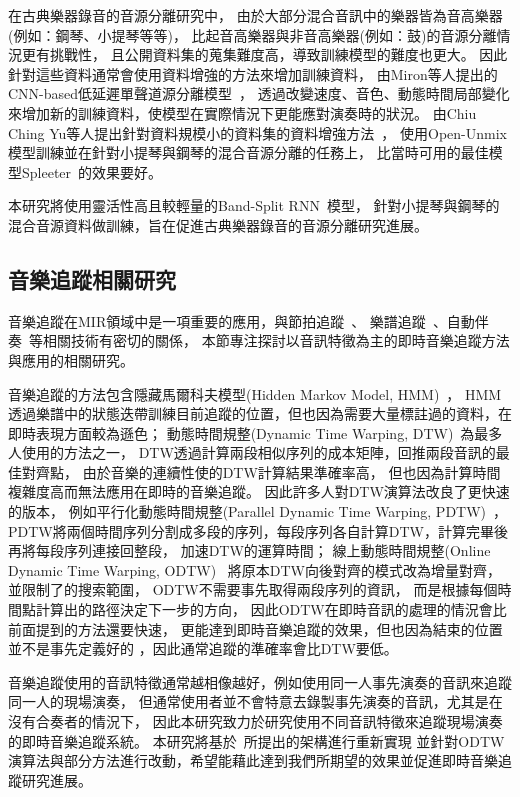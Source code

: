 \documentclass[class=NCU_thesis, crop=false]{standalone}
\begin{document}
在古典樂器錄音的音源分離研究中，
由於大部分混合音訊中的樂器皆為音高樂器(例如：鋼琴、小提琴等等)，
比起音高樂器與非音高樂器(例如：鼓)的音源分離情況更有挑戰性，
且公開資料集的蒐集難度高，導致訓練模型的難度也更大。
因此針對這些資料通常會使用資料增強的方法來增加訓練資料，
由Miron等人提出的CNN-based低延遲單聲道源分離模型~\cite{miron2017generating}，
透過改變速度、音色、動態時間局部變化來增加新的訓練資料，使模型在實際情況下更能應對演奏時的狀況。
由Chiu Ching Yu等人提出針對資料規模小的資料集的資料增強方法~\cite{Chiu_ChingYu2020MixingSpecific}，
使用Open-Unmix模型訓練並在針對小提琴與鋼琴的混合音源分離的任務上，
比當時可用的最佳模型Spleeter~\cite{hennequin2020spleeter}的效果要好。

本研究將使用靈活性高且較輕量的Band-Split RNN~\cite{Luo_Yi2022MusicSourceSeparation}模型，
針對小提琴與鋼琴的混合音源資料做訓練，旨在促進古典樂器錄音的音源分離研究進展。


\subsection{音樂追蹤相關研究}
音樂追蹤在MIR領域中是一項重要的應用，與節拍追蹤~\cite{heydari2021don, goto2021musical, di2021downbeat}、
樂譜追蹤~\cite{henkel2019score}、自動伴奏~\cite{zhang2023design}等相關技術有密切的關係，
本節專注探討以音訊特徵為主的即時音樂追蹤方法與應用的相關研究。

音樂追蹤的方法包含隱藏馬爾科夫模型(Hidden Markov Model, HMM)~\cite{cano1999score}，
HMM透過樂譜中的狀態迭帶訓練目前追蹤的位置，但也因為需要大量標註過的資料，在即時表現方面較為遜色；
動態時間規整(Dynamic Time Warping, DTW)~\cite{Arzt2012Adaptive, Raffel2016Optimizing}為最多人使用的方法之一，
DTW透過計算兩段相似序列的成本矩陣，回推兩段音訊的最佳對齊點，
由於音樂的連續性使的DTW計算結果準確率高，
但也因為計算時間複雜度高而無法應用在即時的音樂追蹤。
因此許多人對DTW演算法改良了更快速的版本，
例如平行化動態時間規整(Parallel Dynamic Time Warping, PDTW)~\cite{Wei2018Online}，
PDTW將兩個時間序列分割成多段的序列，每段序列各自計算DTW，計算完畢後再將每段序列連接回整段，
加速DTW的運算時間；
線上動態時間規整(Online Dynamic Time Warping, ODTW)~\cite{dixon2005ODTW, Arzt2010Towards, Lin2020AHumanComputerDuetSystem}
將原本DTW向後對齊的模式改為增量對齊，並限制了的搜索範圍，
ODTW不需要事先取得兩段序列的資訊，
而是根據每個時間點計算出的路徑決定下一步的方向，
因此ODTW在即時音訊的處理的情況會比前面提到的方法還要快速，
更能達到即時音樂追蹤的效果，但也因為結束的位置並不是事先定義好的
，因此通常追蹤的準確率會比DTW要低。

音樂追蹤使用的音訊特徵通常越相像越好，例如使用同一人事先演奏的音訊來追蹤同一人的現場演奏，
但通常使用者並不會特意去錄製事先演奏的音訊，尤其是在沒有合奏者的情況下，
因此本研究致力於研究使用不同音訊特徵來追蹤現場演奏的即時音樂追蹤系統。
本研究將基於~\cite{Lin2020AHumanComputerDuetSystem}所提出的架構進行重新實現
並針對ODTW演算法與部分方法進行改動，希望能藉此達到我們所期望的效果並促進即時音樂追蹤研究進展。


\pagebreak
\end{document}

